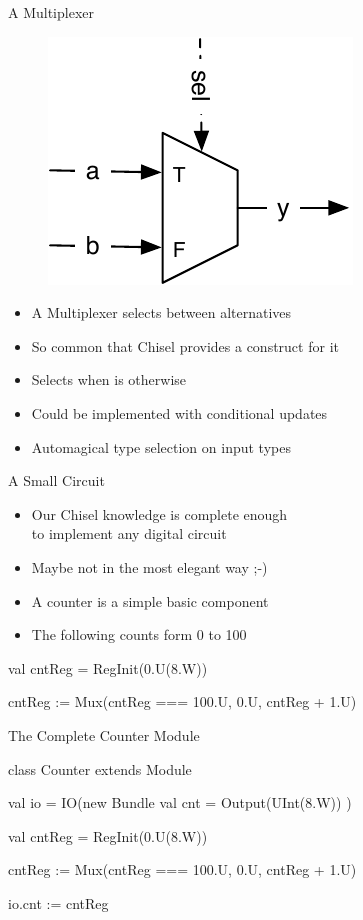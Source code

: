 \begin{frame}[fragile]{A Multiplexer}
\begin{figure}
  \includegraphics[scale=\scale]{../figures/mux}
\end{figure}
\begin{itemize}
\item A Multiplexer selects between alternatives
\item So common that Chisel provides a construct for it
\item Selects  when  is  otherwise 
\item Could be implemented with conditional updates
\item Automagical type selection on input types
\end{itemize}
\end{frame}

\begin{frame}[fragile]{A Small Circuit}
\begin{itemize}
\item Our Chisel knowledge is complete enough\\ to implement any digital circuit
\item Maybe not in the most elegant way ;-)
\item A counter is a simple basic component
\item The following counts form 0 to 100
\end{itemize}
\begin{chisel}
  val cntReg = RegInit(0.U(8.W))

  cntReg := Mux(cntReg === 100.U,
    0.U, cntReg + 1.U)
\end{chisel}
\end{frame}

\begin{frame}[fragile]{The Complete Counter Module}
\begin{chisel}
class Counter extends Module {
  val io = IO(new Bundle {
    val cnt = Output(UInt(8.W))
  })

  val cntReg = RegInit(0.U(8.W))

  cntReg := Mux(cntReg === 100.U,
    0.U, cntReg + 1.U)

  io.cnt := cntReg
}
\end{chisel}
\end{frame}

